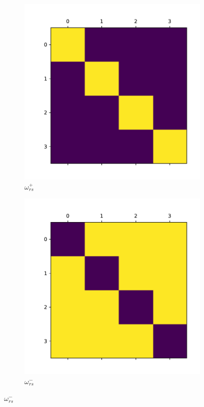 \documentclass{beamer}
\begin{document}
\begin{frame}[c]
\begin{figure}
\begin{center}
\begin{subfigure}[b]{0.3\textwidth}
				\includegraphics[width=\textwidth]{out/synthetic/model2_omega_positive3.pdf}
				\caption{$\omega ^{+} _{rs} $}
				\label{fig:out/synthetic/omega_positive1.pdf}
			\end{subfigure}
			\begin{subfigure}[b]{0.3\textwidth}
				\centering
				\includegraphics[width=\textwidth]{out/synthetic/model2_omega_negative3.pdf}
				\caption{$\omega ^{-} _{rs} $}
				\label{fig:}
			\end{subfigure}
		\end{center}
	\end{figure}


\end{frame}
\end{document}
